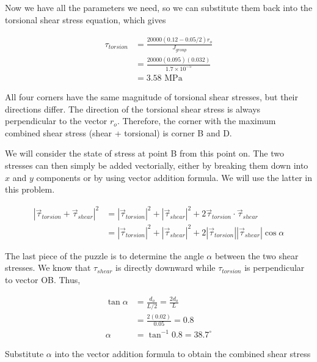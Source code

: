 \documentclass[a4paper,openany,12pt]{book}
\begin{document}
{{Now we have all the parameters we need, so we can substitute them back
into the torsional shear stress equation, which gives

$$\begin{aligned}
     \tau_{torsion} &= \frac{20000(0.12-0.05/2) r_o}{J_{group}} \\
                    &= \frac{20000(0.095)(0.032)}{1.7 \times 10^{-5}} \\
                    &= 3.58 \text{ MPa}
   \end{aligned}$$

All four corners have the same magnitude of torsional shear stresses,
but their directions differ. The direction of the torsional shear stress
is always perpendicular to the vector \(r_o\). Therefore, the corner with
the maximum combined shear stress (shear + torsional) is corner B and D.


We will consider the state of stress at point B from this point on. The
two stresses can then simply be added vectorially, either by breaking
them down into \(x\) and \(y\) components or by using vector addition
formula. We will use the latter in this problem.

$$\begin{aligned}
    \left| \vec{\tau}_{torsion} + \vec{\tau}_{shear} \right|^2 &= \left| \vec{\tau}_{torsion} \right|^2 + \left| \vec{\tau}_{shear} \right|^2 + 2 \vec{\tau}_{torsion} \cdot \vec{\tau}_{shear} \\
                                                               &= \left| \vec{\tau}_{torsion} \right|^2 + \left| \vec{\tau}_{shear} \right|^2 + 2 \left| \vec{\tau}_{torsion} \right| \left| \vec{\tau}_{shear} \right| \cos \alpha
  \end{aligned}$$

The last piece of the puzzle is to determine the angle \(\alpha\) between
the two shear stresses. We know that \(\tau_{shear}\) is directly downward
while \(\tau_{torsion}\) is perpendicular to vector OB. Thus,

$$\begin{aligned}
    \tan \alpha &= \frac{d_o}{L/2} = \frac{2 d_o}{L} \\
                &= \frac{2(0.02)}{0.05} = 0.8 \\
    \alpha &= \tan^{-1} 0.8 = 38.7^{\circ}
  \end{aligned}$$

Substitute \(\alpha\) into the vector addition formula to obtain the
combined shear stress

}}
\end{document}

